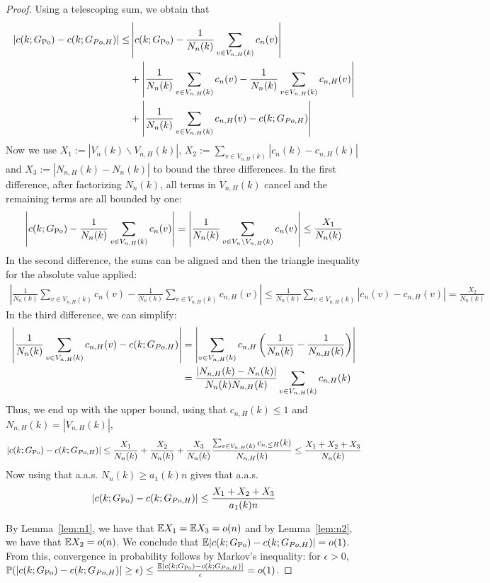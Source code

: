 \begin{proof}
Using a telescoping sum, we obtain that
\begin{align*}
|c(k;G_{\text{Po}})-c(k;G_{Po,H})| \leq & \left|c(k;G_{\text{Po}})-\frac{1}{N_n(k)}\sum_{v \in V_{n,H}(k)} c_n(v)\right|\\
&+\left|\frac{1}{N_n(k)}\sum_{v \in V_{n,H}(k)} c_n(v) -\frac{1}{N_n(k)}\sum_{v \in V_{n,H}(k)}c_{n,H}(v)\right| \\
&+\left|\frac{1}{N_n(k)}\sum_{v \in V_{n,H}(k)} c_{n, H}(v)-c(k;G_{Po,H})\right| 
\end{align*}
Now we use $X_1 := |V_n(k)\backslash V_{n,H}(k)|$, $X_2 := \sum_{v \in V_{n,H}(k)}|c_n(k)-c_{n,H}(k)|$ and $X_3 :=|N_{n,H}(k)-N_n(k)|$ to bound the three differences. In the first difference, after factorizing $N_n(k)$, all terms in $V_{n,H}(k)$ cancel and the remaining terms are all bounded by one:
\begin{align*}
\left|c(k;G_{\text{Po}})-\frac{1}{N_n(k)}\sum_{v \in V_{n,H}(k)} c_n(v)\right| = \left| \frac{1}{N_n(k)}\sum_{v \in V_n \backslash V_{n,H}(k)} c_n(v) \right| \leq \frac{X_1}{N_n(k)}
\end{align*}
In the second difference, the sums can be aligned and then the triangle inequality for the absolute value applied:
\begin{align*}
\left|\frac{1}{N_n(k)}\sum_{v \in V_{n,H}(k)} c_n(v) -\frac{1}{N_n(k)}\sum_{v \in V_{n,H}(k)}c_{n,H}(v)\right| \leq \frac{1}{N_n(k)}\sum_{v \in V_{n,H}(k)} \left|c_n(v)-c_{n,H}(v)\right| =\frac{X_2}{N_n(k)}
\end{align*}
In the third difference, we can simplify:
\begin{align*}
\left|\frac{1}{N_n(k)}\sum_{v \in V_{n,H}(k)} c_{n, H}(v)-c(k;G_{Po,H})\right| &= \left|\sum_{v\in V_{n,H}(k)} c_{n,H} \left(\frac{1}{N_n(k)}-\frac{1}{N_{n,H}(k)}\right)\right| \\
&= \frac{|N_{n,H}(k)-N_n(k)|}{N_n(k)N_{n,H}(k)}\sum_{v \in V_{n,H}(k)}c_{n,H}(k)
\end{align*}
Thus, we end up with the upper bound, using that $c_{n,H}(k) \leq 1$ and $N_{n,H}(k) = |V_{n,H}(k)|$,
\begin{align*}
|c(k;G_{\text{Po}})-c(k;G_{Po,H})| \leq \frac{X_1}{N_n(k)}+\frac{X_2}{N_n(k)}+\frac{X_3}{N_n(k)}\frac{\sum_{v \in V_{n,H}(k)}c_{n,\leq H}(k)}{N_{n,H}(k)} \leq \frac{X_1+X_2+X_3}{N_n(k)}
\end{align*}
Now using that a.a.s. $N_n(k) \geq a_1(k)n$ gives that a.a.s.
\begin{align*}
|c(k;G_{\text{Po}})-c(k;G_{Po,H})| \leq \frac{X_1+X_2+X_3}{a_1(k)n} 
\end{align*}

By Lemma~\ref{lem:n1}, we have that $\mathbb{E} X_1 = \mathbb{E} X_3 = o(n)$ and by Lemma~\ref{lem:n2}, we have that $\mathbb{E} X_2 = o(n)$. We conclude that $\mathbb{E} |c(k;G_{\text{Po}})-c(k;G_{Po,H})| = o(1)$. From this, convergence in probability follows by Markov's inequality: for $\epsilon >0$, $\mathbb{P}(|c(k;G_{\text{Po}})-c(k;G_{Po,H})| \geq \epsilon) \leq \frac{\mathbb{E}|c(k;G_{\text{Po}})-c(k;G_{Po,H})|}{\epsilon} = o(1)$.
\end{proof}
